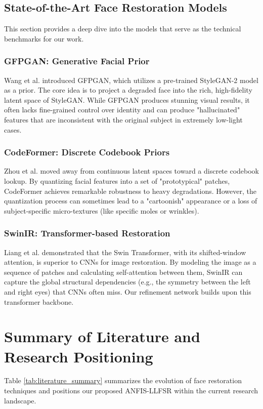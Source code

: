 \subsection{State-of-the-Art Face Restoration Models}
This section provides a deep dive into the models that serve as the technical benchmarks for our work.

\subsubsection{GFPGAN: Generative Facial Prior}
Wang et al. \cite{wang2021towards} introduced GFPGAN, which utilizes a pre-trained StyleGAN-2 model as a prior. The core idea is to project a degraded face into the rich, high-fidelity latent space of StyleGAN. While GFPGAN produces stunning visual results, it often lacks fine-grained control over identity and can produce "hallucinated" features that are inconsistent with the original subject in extremely low-light cases.

\subsubsection{CodeFormer: Discrete Codebook Priors}
Zhou et al. \cite{zhou2022codeformer} moved away from continuous latent spaces toward a discrete codebook lookup. By quantizing facial features into a set of "prototypical" patches, CodeFormer achieves remarkable robustness to heavy degradations. However, the quantization process can sometimes lead to a "cartoonish" appearance or a loss of subject-specific micro-textures (like specific moles or wrinkles).

\subsubsection{SwinIR: Transformer-based Restoration}
Liang et al. \cite{liang2021swinir} demonstrated that the Swin Transformer, with its shifted-window attention, is superior to CNNs for image restoration. By modeling the image as a sequence of patches and calculating self-attention between them, SwinIR can capture the global structural dependencies (e.g., the symmetry between the left and right eyes) that CNNs often miss. Our refinement network builds upon this transformer backbone.

\section{Summary of Literature and Research Positioning}
Table \ref{tab:literature_summary} summarizes the evolution of face restoration techniques and positions our proposed ANFIS-LLFSR within the current research landscape.

